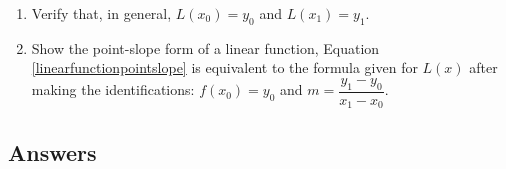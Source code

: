 \documentclass{ximera}
\begin{document}
\begin{enumerate}
\begin{enumerate}
\begin{multicols}{4}
\begin{enumerate}
\end{enumerate}

\end{multicols}

\item  Verify that, in general, $L(x_{0}) = y_{0}$ and $L(x_{1}) = y_{1}$.

\item  Show the point-slope form of a linear function, Equation \ref{linearfunctionpointslope} is equivalent to the formula given for $L(x)$ after making the identifications:  $f(x_{0}) = y_{0}$ and $m = \dfrac{y_{1} - y_{0}}{x_{1} - x_{0}}$.

\end{enumerate}




\setcounter{HW}{\value{enumi}}
\end{enumerate}


\newpage

\subsection{Answers}
\end{document}
